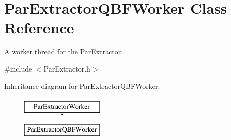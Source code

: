 \hypertarget{classParExtractorQBFWorker}{\section{Par\-Extractor\-Q\-B\-F\-Worker Class Reference}
\label{classParExtractorQBFWorker}
}


A worker thread for the \hyperlink{classParExtractor}{Par\-Extractor}.  




{\ttfamily \#include $<$Par\-Extractor.\-h$>$}

Inheritance diagram for Par\-Extractor\-Q\-B\-F\-Worker\-:\begin{figure}[H]
\begin{center}
\leavevmode
\includegraphics[height=2.000000cm]{classParExtractorQBFWorker}
\end{center}
\end{figure}
